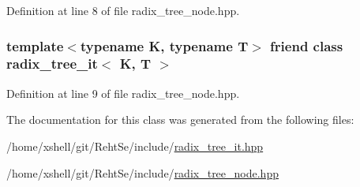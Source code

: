 Definition at line 8 of file radix\+\_\+tree\+\_\+node.\+hpp.

\subsubsection[{\texorpdfstring{radix\+\_\+tree\+\_\+it$<$ K, T $>$}{radix_tree_it< K, T >}}]{\setlength{\rightskip}{0pt plus 5cm}template$<$typename K, typename T$>$ friend class {\bf radix\+\_\+tree\+\_\+it}$<$ K, T $>$\hspace{0.3cm}{\ttfamily [friend]}}\hypertarget{classradix__tree__node_a11139749f60f9d620915dd76917d1479}{}\label{classradix__tree__node_a11139749f60f9d620915dd76917d1479}


Definition at line 9 of file radix\+\_\+tree\+\_\+node.\+hpp.



The documentation for this class was generated from the following files\+:\begin{DoxyCompactItemize}
\item 
/home/xshell/git/\+Reht\+Se/include/\hyperlink{radix__tree__it_8hpp}{radix\+\_\+tree\+\_\+it.\+hpp}\item 
/home/xshell/git/\+Reht\+Se/include/\hyperlink{radix__tree__node_8hpp}{radix\+\_\+tree\+\_\+node.\+hpp}\end{DoxyCompactItemize}
